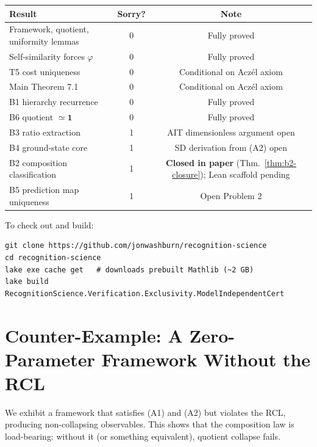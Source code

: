 \documentclass[11pt]{article}
\theoremstyle{definition}
\theoremstyle{remark}
\begin{document}
\begin{center}
\renewcommand{\arraystretch}{1.1}
\small
\begin{tabular}{lcc}
\hline
\textbf{Result} & \textbf{Sorry?} & \textbf{Note} \\
\hline
Framework, quotient, uniformity lemmas & 0 & Fully proved \\
Self-similarity forces $\varphi$ & 0 & Fully proved \\
T5 cost uniqueness & 0 & Conditional on Acz\'el axiom \\
Main Theorem 7.1 & 0 & Conditional on Acz\'el axiom \\
B1 hierarchy recurrence & 0 & Fully proved \\
B6 quotient $\simeq \mathbf{1}$ & 0 & Fully proved \\
B3 ratio extraction & 1 & AIT dimensionless argument open \\
B4 ground-state core & 1 & SD derivation from (A2) open \\
B2 composition classification & 1 & \textbf{Closed in paper} (Thm.~\ref{thm:b2-closure}); Lean scaffold pending \\
B5 prediction map uniqueness & 1 & Open Problem 2 \\
\hline
\end{tabular}
\end{center}

\medskip\noindent
To check out and build:
\begin{verbatim}
git clone https://github.com/jonwashburn/recognition-science
cd recognition-science
lake exe cache get   # downloads prebuilt Mathlib (~2 GB)
lake build RecognitionScience.Verification.Exclusivity.ModelIndependentCert
\end{verbatim}

\section{Counter-Example: A Zero-Parameter Framework Without the RCL}
\label{app:counterexample}

We exhibit a framework that satisfies (A1) and (A2) but violates
the RCL, producing non-collapsing observables.
This shows that the composition law is load-bearing: without it
(or something equivalent), quotient collapse fails.
\end{document}

